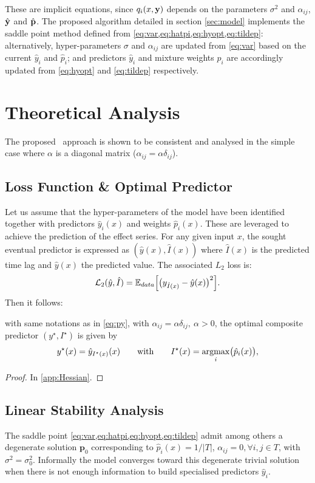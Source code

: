 These are implicit equations, since $q_i(x,{\bf y})$ depends on the parameters $\sigma^2$ and 
$\alpha_{ij}$, $\hat {\bf y}$ and $\hat{\bf p}$. The proposed algorithm detailed in section \ref{sec:model} 
implements the saddle point method defined from \cref{eq:var,eq:hatpi,eq:hyopt,eq:tildep}: 
alternatively, hyper-parameters $\sigma$ and $\alpha_{ij}$ are updated from \cref{eq:var} based on 
the current $\hat y_i$ and $\hat p_i$; and predictors $\hat y_i$ and mixture weights $\hat p_i$ are 
accordingly updated from \cref{eq:hyopt} and \cref{eq:tildep} respectively. 

\section{Theoretical Analysis}\label{sec:dtlrtheory}
The proposed \XX\ approach is shown to be consistent and analysed in the simple case where $\alpha$ 
is a diagonal matrix ($\alpha_{ij} = \alpha\delta_{ij}$).

\subsection{Loss Function \& Optimal Predictor}\label{sec:prop}
Let us assume that the hyper-parameters of the model have been identified together with predictors 
$\hat y_i(x)$ and weights $\hat p_i(x)$. These are leveraged to achieve the prediction of the 
effect series. For any given input $x$, the sought eventual predictor is expressed as 
$(\hat y(x),\hat I(x))$ where $\hat I(x)$ is the predicted time lag and $\hat y(x)$ the predicted 
value. The associated $L_2$ loss is: 
%
\begin{equation}\label{eq:orloss}
  {\cal L}_2(\hat y,\hat I) = {\mathbb E}_{data}\Bigl[\bigl(y_{\hat I(x)}-\hat y(x)\bigr)^2\Bigr]. 
\end{equation}
%
Then it follows:
%
\begin{prop}\label{prop:opred}
with same notations as in \cref{eq:py}, with $\alpha_{ij} = \alpha\delta_{ij},\ \alpha>0$, 
the optimal composite predictor $(y^\star,I^\star)$ is given by
\[
  y^\star(x) = 
    \hat y_{I^\star(x)}(x)\qquad\text{with}\qquad I^\star(x) = \operatorname*{argmax}_{i} \bigl(\hat p_i(x)\bigr), 
\]
\end{prop}
%
\begin{proof}
In \cref{app:Hessian}.
\end{proof}

\subsection{Linear Stability Analysis}\label{sec:stability}
The saddle point \cref{eq:var,eq:hatpi,eq:hyopt,eq:tildep} admit among others a degenerate 
solution $\mathbf{p}_0$ corresponding to $\hat p_i(x) = 1/\vert T\vert$, 
$\alpha_{ij}=0, \forall i,j \in T$, with $\sigma^2 = \sigma_0^2$. Informally the model converges 
toward this degenerate trivial solution when there is not enough information to build specialised 
predictors $\hat y_i$. 

